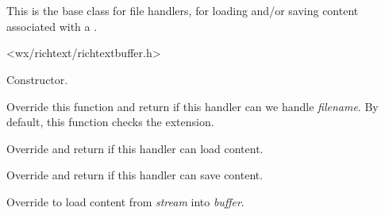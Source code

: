 \section{}\label{wxrichtextfilehandler}

This is the base class for file handlers, for loading and/or saving content
associated with a .




<wx/richtext/richtextbuffer.h>



\label{wxrichtextfilehandlerwxrichtextfilehandler}


Constructor.

\label{wxrichtextfilehandlercanhandle}


Override this function and return \true if this handler can we handle {\it filename}. By default,
this function checks the extension.

\label{wxrichtextfilehandlercanload}


Override and return \true if this handler can load content.

\label{wxrichtextfilehandlercansave}


Override and return \true if this handler can save content.

\label{wxrichtextfilehandlerdoloadfile}


Override to load content from {\it stream} into {\it buffer}.

